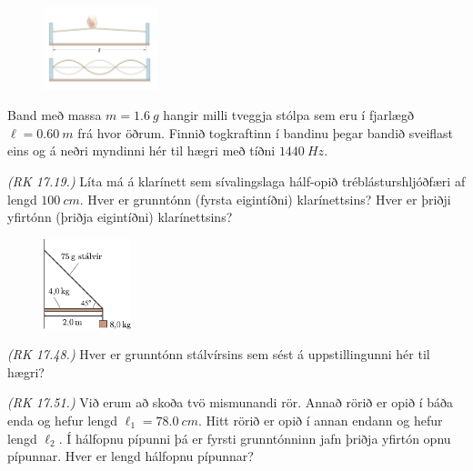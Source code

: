 \ifdefined \wholebook \else\documentclass[oneside]{book}\usepackage{EdlBook}\graphicspath{{figures/}}
\begin{document}
\begin{enumerate}[label = \textbf{Dæmi \thechapter.\arabic*.}]
\begin{minipage}{\linewidth}
\end{minipage}

\begin{minipage}{\linewidth}

\begin{figure}
\vspace{-1cm}
\includegraphics[width = 1.3in]{images/plokkun.png}
\end{figure}

\item Band með massa $m = \SI{1.6}{g}$ hangir milli tveggja stólpa sem eru í fjarlægð $\ell = \SI{0.60}{m}$ frá hvor öðrum. Finnið togkraftinn í bandinu þegar bandið sveiflast eins og á neðri myndinni hér til hægri með tíðni $\SI{1440}{Hz}$.

\item \textit{(RK 17.19.)} Líta má á klarínett sem sívalingslaga hálf-opið tréblásturshljóðfæri af lengd $\SI{100}{cm}$. Hver er grunntónn (fyrsta eigintíðni) klarínettsins? Hver er þriðji yfirtónn (þriðja eigintíðni) klarínettsins?

\end{minipage}

\begin{minipage}{\linewidth}

\begin{figure}
\vspace{-0.5cm}
\includegraphics[width = 1in]{figures/copybest.pdf}
\end{figure}

\item \textit{(RK 17.48.)} Hver er grunntónn stálvírsins sem sést á uppstillingunni hér til hægri?

\item \textit{(RK 17.51.)} Við erum að skoða tvö mismunandi rör. Annað rörið er opið í báða enda og hefur lengd $\ell_1 = \SI{78.0}{cm}$. Hitt rörið er opið í annan endann og hefur lengd $\ell_2$. Í hálfopnu pípunni þá er fyrsti grunntónninn jafn þriðja yfirtón opnu pípunnar. Hver er lengd hálfopnu pípunnar?


\end{minipage}

\end{enumerate}
\end{document}
